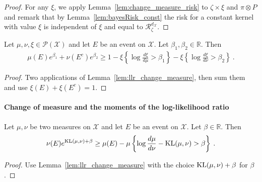 \begin{proof}%
{}
For any $\xi$, we apply Lemma~\ref{lem:change_measure_risk} to $\zeta \times \xi$ and $\pi \otimes P$ and remark that by Lemma~\ref{lem:bayesRisk_const} the risk for a constant kernel with value $\xi$ is independent of $\xi$ and equal to $\mathcal R_\zeta^{d_{\mathcal X}}$.
\end{proof}


\begin{lemma}
  \label{lem:llr_change_measure_add}
  \leanok
  Let $\mu, \nu, \xi \in \mathcal P(\mathcal X)$ and let $E$ be an event on $\mathcal X$. Let $\beta_1, \beta_2 \in \mathbb{R}$. Then
  \begin{align*}
  \mu(E) e^{\beta_1} + \nu(E^c) e^{\beta_2} \ge 1 - \xi\left\{ \log\frac{d \xi}{d \mu} > \beta_1 \right\} - \xi\left\{ \log\frac{d \xi}{d \nu} > \beta_2 \right\} \: .
  \end{align*}
\end{lemma}

\begin{proof}\leanok
{}
Two applications of Lemma~\ref{lem:llr_change_measure}, then sum them and use $\xi(E)+\xi(E^c) = 1$.
\end{proof}



\paragraph{Change of measure and the moments of the log-likelihood ratio}

\begin{corollary}
  \label{cor:kl_change_measure}
  Let $\mu, \nu$ be two measures on $\mathcal X$ and let $E$ be an event on $\mathcal X$. Let $\beta \in \mathbb{R}$. Then
  \begin{align*}
  \nu(E) e^{\operatorname{KL}(\mu, \nu) + \beta} \ge \mu(E) - \mu\left\{ \log\frac{d \mu}{d \nu} - \operatorname{KL}(\mu, \nu) > \beta \right\} \: .
  \end{align*}
\end{corollary}

\begin{proof}
Use Lemma~\ref{lem:llr_change_measure} with the choice $\operatorname{KL}(\mu, \nu) + \beta$ for $\beta$.
\end{proof}


